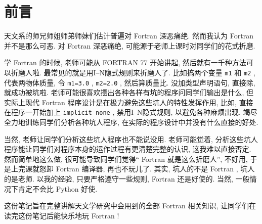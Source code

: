 \chapter*{前言}

天文系的师兄师姐师弟师妹们估计普遍对 Fortran 深恶痛绝. 然而我认为 Fortran 并不是那么可恶. 对 Fortran 深恶痛绝, 可能源于老师上课时对同学们的花式折磨.

学 Fortran 的时候, 老师可能从 FORTRAN 77 开始讲起, 然后就有一千种方法可以折磨人啦. 最常见的就是用I--N隐式规则来折磨人了. 比如搞两个变量 \texttt{m1} 和 \texttt{m2} , 代表两物体质量, 令 \texttt{m1=3.0} , \texttt{m2=2.0} , 然后算质量比. 没加类型声明语句, 直接除, 就成功被坑啦. 老师可能很喜欢摆出各种各样有坑的程序问同学们输出是什么, 但实际上现代 Fortran 程序设计是在极力避免这些坑人的特性发挥作用, 比如, 直接在程序一开始加上 \texttt{implicit none} , 禁用I--N隐式规则, 以避免各种麻烦出现. 竭尽全力地训练同学们分析各种坑人程序, 在实际的程序设计中并没有什么直接的好处.

当然, 老师让同学们分析这些坑人程序也不能说没用. 老师可能觉着, 分析这些坑人程序能让同学们对程序本身的运作过程有更清楚完整的认识, 这我难以直接否定. 然而简单地这么做, 很可能导致同学们觉得`` Fortran 就是这么折磨人'', 不好用, 于是上完课就怒卸 Fortran 编译器, 再也不玩儿了. 其实, 坑人的不是 Fortran , 坑人的是老师. 以我的经验, 只要严格遵守一些规则, Fortran 还是好使的. 当然, 一般情况下肯定不会比 Python 好使.

这份笔记旨在完整讲解天文学研究中会用到的全部 Fortran 相关知识, 让同学们在读完这份笔记后能快乐地玩 Fortran !
